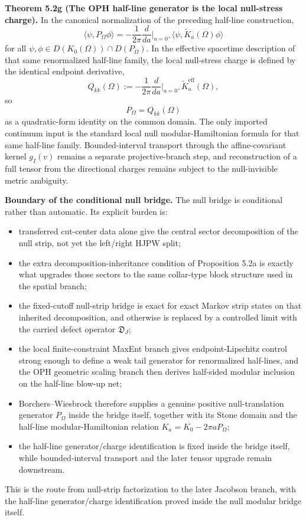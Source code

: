 \textbf{Theorem 5.2g (The OPH half-line generator is the local null-stress charge).} In the canonical normalization of the preceding half-line construction,
\[
\langle\psi,P_\Omega\phi\rangle
=
-\frac{1}{2\pi}\frac{d}{da}\Big|_{a=0^+}
\langle\psi,\widetilde K_a(\Omega)\phi\rangle
\]
for all \(\psi,\phi\in D(K_0(\Omega))\cap D(P_\Omega)\). In the effective spacetime description of that same renormalized half-line family, the local null-stress charge is defined by the identical endpoint derivative,
\[
Q_{kk}(\Omega)
:=
-\frac{1}{2\pi}\frac{d}{da}\Big|_{a=0^+}\widetilde K^{\mathrm{eff}}_a(\Omega),
\]
so
\[
P_\Omega = Q_{kk}(\Omega)
\]
as a quadratic-form identity on the common domain. The only imported continuum input is the standard local null modular-Hamiltonian formula for that same half-line family. Bounded-interval transport through the affine-covariant kernel \(g_I(v)\) remains a separate projective-branch step, and reconstruction of a full tensor from the directional charges remains subject to the null-invisible metric ambiguity.

\textbf{Boundary of the conditional null bridge.} The null bridge is conditional rather than automatic. Its explicit burden is:
\begin{itemize}
\tightlist
\item
  transferred cut-center data alone give the central sector decomposition of the null strip, not yet the left/right HJPW split;
\item
  the extra decomposition-inheritance condition of Proposition 5.2a is exactly what upgrades those sectors to the same collar-type block structure used in the spatial branch;
\item
  the fixed-cutoff null-strip bridge is exact for exact Markov strip states on that inherited decomposition, and otherwise is replaced by a controlled limit with the carried defect operator \(\mathfrak D_J\);
\item
  the local finite-constraint MaxEnt branch gives endpoint-Lipschitz control strong enough to define a weak tail generator for renormalized half-lines, and the OPH geometric scaling branch then derives half-sided modular inclusion on the half-line blow-up net;
\item
  Borchers--Wiesbrock therefore supplies a genuine positive null-translation generator \(P_\Omega\) inside the bridge itself, together with its Stone domain and the half-line modular-Hamiltonian relation \(K_a=K_0-2\pi aP_\Omega\);
\item
  the half-line generator/charge identification is fixed inside the bridge itself, while bounded-interval transport and the later tensor upgrade remain downstream.
\end{itemize}
This is the route from null-strip factorization to the later Jacobson branch, with the half-line generator/charge identification proved inside the null modular bridge itself.
